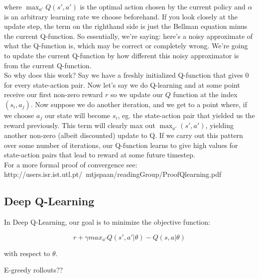 \documentclass[11pt]{article}
\theoremstyle{plain}
\theoremstyle{definition}
\begin{document}
where $\max_{a'} Q(s',a')$ is the optimal action chosen by the current policy and $\alpha$ is an arbitrary learning rate we choose beforehand. If you look closely at the update step, the term on the righthand side is just the Bellman equation minus the current Q-function. So essentially, we're saying: here's a noisy approximate of what the Q-function is, which may be correct or completely wrong. We're going to update the current Q-function by how different this noisy approximator is from the current Q-function.
\\

So why does this work? Say we have a freshly initialized Q-function that gives 0 for every state-action pair. Now let's say we do Q-learning and at some point receive our first non-zero reward $r$ so we update our $Q$ function at the index $(s_i,a_j)$. Now suppose we do another iteration, and we get to a point where, if we choose $a_j$ our state will become $s_i$, eg. the state-action pair that yielded us the reward previously. This term will clearly max out $\max_{a'} (s',a')$, yielding another non-zero (albeit discounted) update to Q. If we carry out this pattern over some number of iterations, our Q-function learns to give high values for state-action pairs that lead to reward at some future timestep.
\\

For a more formal proof of convergence see: http://users.isr.ist.utl.pt/~mtjspaan/readingGroup/ProofQlearning.pdf

\subsection{Deep Q-Learning}

In Deep Q-Learning, our goal is to minimize the objective function:

\begin{equation}
r + \gamma max_{a'}Q(s',a'|\theta) - Q(s,a|\theta)
\end{equation}

with respect to $\theta$.

E-greedy rollouts??
\end{document}
